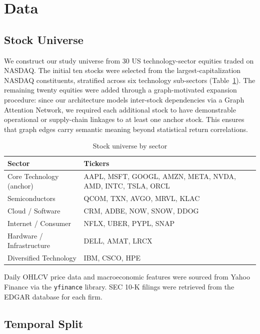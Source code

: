 \documentclass[12pt, a4paper]{article}
\begin{document}
\section{Data}
\label{sec:data}

\subsection{Stock Universe}

We construct our study universe from 30 US technology-sector equities traded on NASDAQ. The initial ten stocks were selected from the largest-capitalization NASDAQ constituents, stratified across six technology sub-sectors (Table~\ref{tab:stocks}). The remaining twenty equities were added through a graph-motivated expansion procedure: since our architecture models inter-stock dependencies via a Graph Attention Network, we required each additional stock to have demonstrable operational or supply-chain linkages to at least one anchor stock. This ensures that graph edges carry semantic meaning beyond statistical return correlations.

\begin{table}[H]
\centering
\caption{Stock universe by sector}
\label{tab:stocks}
\begin{tabular}{ll}
\toprule
\textbf{Sector} & \textbf{Tickers} \\
\midrule
Core Technology (anchor) & AAPL, MSFT, GOOGL, AMZN, META, NVDA, AMD, INTC, TSLA, ORCL \\
Semiconductors           & QCOM, TXN, AVGO, MRVL, KLAC \\
Cloud / Software         & CRM, ADBE, NOW, SNOW, DDOG \\
Internet / Consumer      & NFLX, UBER, PYPL, SNAP \\
Hardware / Infrastructure& DELL, AMAT, LRCX \\
Diversified Technology   & IBM, CSCO, HPE \\
\bottomrule
\end{tabular}
\end{table}

Daily OHLCV price data and macroeconomic features were sourced from Yahoo Finance via the \texttt{yfinance} library. SEC 10-K filings were retrieved from the EDGAR database for each firm.

\subsection{Temporal Split}
\end{document}
